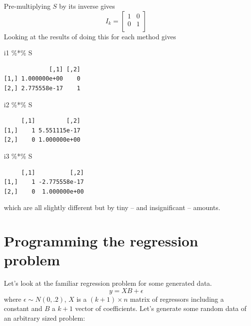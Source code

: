 \documentclass[
  letterpaper,
]{book}
\newenvironment{Shaded}{\begin{snugshade}}{\end{snugshade}}
\newcommand{\NormalTok}[1]{\textcolor[rgb]{0.00,0.23,0.31}{#1}}
\newcommand{\SpecialCharTok}[1]{\textcolor[rgb]{0.37,0.37,0.37}{#1}}
\begin{document}
Pre-multiplying \(S\) by its inverse gives \[
I_k = \left[\begin{array}{r}1 &0 \\0 &1 \\\end{array}\right]
\] Looking at the results of doing this for each method gives

\begin{Shaded}
\begin{Highlighting}[]
\NormalTok{i1 }\SpecialCharTok{\%*\%}\NormalTok{ S}
\end{Highlighting}
\end{Shaded}

\begin{verbatim}
             [,1] [,2]
[1,] 1.000000e+00    0
[2,] 2.775558e-17    1
\end{verbatim}

\begin{Shaded}
\begin{Highlighting}[]
\NormalTok{i2 }\SpecialCharTok{\%*\%}\NormalTok{ S}
\end{Highlighting}
\end{Shaded}

\begin{verbatim}
     [,1]         [,2]
[1,]    1 5.551115e-17
[2,]    0 1.000000e+00
\end{verbatim}

\begin{Shaded}
\begin{Highlighting}[]
\NormalTok{i3 }\SpecialCharTok{\%*\%}\NormalTok{ S}
\end{Highlighting}
\end{Shaded}

\begin{verbatim}
     [,1]          [,2]
[1,]    1 -2.775558e-17
[2,]    0  1.000000e+00
\end{verbatim}

which are all slightly different but by tiny -- and insignificant --
amounts.

\hypertarget{programming-the-regression-problem}{%
\section{Programming the regression
problem}\label{programming-the-regression-problem}}

Let's look at the familiar regression problem for some generated data.
\[
  y = XB + \epsilon
\] where \(\epsilon \sim N(0,.2)\), \(X\) is a \((k+1)\times n\) matrix
of regressors including a constant and \(B\) a \(k+1\) vector of
coefficients. Let's generate some random data of an arbitrary sized
problem:
\end{document}
